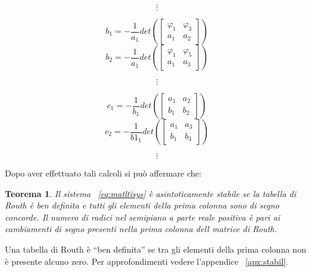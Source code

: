 \documentclass[a4paper]{report}
\begin{document}
\begin{center}
  \begin{displaymath}
    \vdots
  \end{displaymath}
\end{center}
\begin{equation}
  b_1=-\frac{1}{a_1}det\left(\left[
    \begin{array}{cc}
      \varphi_1 & \varphi_3 \\
      a_1 &a_2
    \end{array}
    \right]\right)
\end{equation}
\begin{equation}
  b_2=-\frac{1}{a_1}det\left(\left[
    \begin{array}{cc}
      \varphi_1 & \varphi_5 \\
      a_1 &a_3
    \end{array}
    \right]\right)
\end{equation}
\begin{center}
  \begin{displaymath}
    \vdots
  \end{displaymath}
\end{center}
\begin{equation}
  c_1=-\frac{1}{b_1}det\left(\left[
    \begin{array}{cc}
      a_1 & a_2 \\
      b_1 &b_2
    \end{array}
    \right]\right)
\end{equation}
\begin{equation}
  c_2=-\frac{1}{b1_1}det\left(\left[
    \begin{array}{cc}
      a_1 & a_3 \\
      b_1 &b_3
    \end{array}
    \right]\right)
\end{equation}
\begin{center}
  \begin{displaymath}
    \vdots
  \end{displaymath}
\end{center}

Dopo aver effettuato tali calcoli si pu\`o affermare che:
\newtheorem{Th6}{Teorema}[section]
\begin{Th6}\label{th:routh}
Il sistema ~\ref{eq:matltisys} \`e asintoticamente stabile
se la tabella di Routh \`e ben definita e tutti gli elementi
della prima colonna sono di segno concorde. 
Il numero di radici nel semipiano a parte reale positiva \`e pari ai
cambiamenti di segno presenti nella prima colonna dell matrice di
Routh.
\end{Th6}
Una tabella di Routh \`e ``ben definita'' se tra gli elementi della
prima colonna non \`e presente alcuno zero. Per approfondimenti vedere
l'appendice ~\ref{apx:stabil}.
\end{document}
